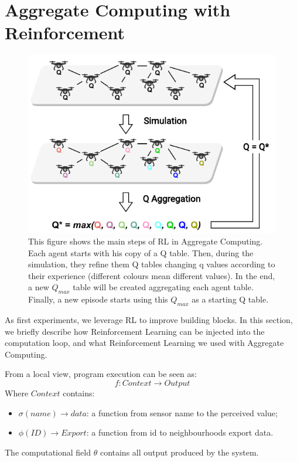\documentclass[conference]{IEEEtran}
\begin{document}
\section{Aggregate Computing with Reinforcement}
\begin{figure}
  \centering
  \includegraphics[width=\linewidth]{img/algorithm-learning.pdf}
  \caption{This figure shows the main steps of RL in Aggregate Computing.
  Each agent starts with his copy of a Q table. 
  Then, during the simulation, they refine them Q tables changing q values according to their experience (different colours mean different values). 
  In the end, a new $Q_{max}$ table will be created aggregating each agent table. 
  Finally, a new episode starts using this $Q_{max}$ as a starting Q table.
  }
  \label{fig:aggregate-q-learning}
\end{figure}
As first experiments, we leverage RL to improve building blocks. 
% 
In this section, we briefly describe how Reinforcement Learning can be injected into the computation loop,
 and what Reinforcement Learning we used with Aggregate Computing.

From a local view, program execution can be seen as:
$$
f : \textit{Context} \rightarrow \textit{Output}
$$
Where $\textit{Context}$ contains:
\begin{itemize}
  \item $\sigma(name) \rightarrow \textit{data}$: a function from sensor name to the perceived value;
  \item $\phi(\textit{ID}) \rightarrow \textit{Export}$: a function from id to neighbourhoods export data.
\end{itemize}
The computational field $\theta$ contains all output produced by the system.
\end{document}

